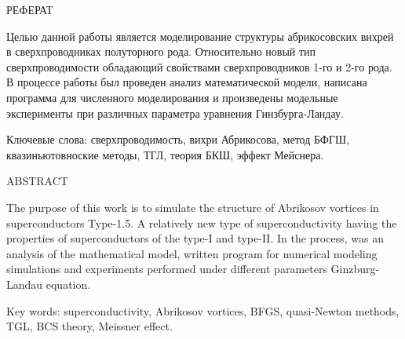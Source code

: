 \begin{center}
	РЕФЕРАТ
\end{center}

Целью данной работы является моделирование структуры абрикосовских вихрей в 
сверхпроводниках полуторного рода. Относительно новый тип сверхпроводимости 
обладающий свойствами сверхпроводников 1-го и 2-го рода. В процессе работы был 
проведен анализ математической модели, написана программа для численного 
моделирования и произведены модельные эксперименты при различных параметра 
уравнения Гинзбурга-Ландау.
\vspace*{1cm}

\noindent Ключевые слова: сверхпроводимость, вихри Абрикосова, метод БФГШ, 
квазиньютовноские методы, ТГЛ, теория БКШ, эффект Мейснера.
\vspace*{1cm}

\begin{center}
    ABSTRACT
\end{center}

The purpose of this work is to simulate the structure of Abrikosov vortices in
superconductors Type-1.5. A relatively new type of superconductivity
having the properties of superconductors of the type-I and type-II. In the 
process, was an analysis of the mathematical model, written program for 
numerical modeling simulations and experiments performed under different 
parameters Ginzburg-Landau equation.

\vspace*{1cm}

\noindent Key words: superconductivity, Abrikosov vortices, BFGS, quasi-Newton 
methods, TGL, BCS theory, Meissner effect.

\newpage